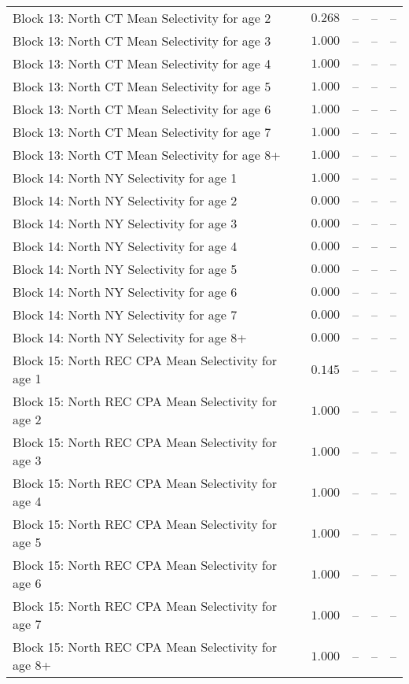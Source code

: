 \documentclass[
]{article}
\begin{document}
\begin{landscape}
\begin{longtable}[t]{lrrrr}
Block 13: North CT Mean Selectivity for age 2 & $0.268$ & -- & -- & --\\
\addlinespace
Block 13: North CT Mean Selectivity for age 3 & $1.000$ & -- & -- & --\\
Block 13: North CT Mean Selectivity for age 4 & $1.000$ & -- & -- & --\\
Block 13: North CT Mean Selectivity for age 5 & $1.000$ & -- & -- & --\\
Block 13: North CT Mean Selectivity for age 6 & $1.000$ & -- & -- & --\\
Block 13: North CT Mean Selectivity for age 7 & $1.000$ & -- & -- & --\\
\addlinespace
Block 13: North CT Mean Selectivity for age 8+ & $1.000$ & -- & -- & --\\
Block 14: North NY Selectivity for age 1 & $1.000$ & -- & -- & --\\
Block 14: North NY Selectivity for age 2 & $0.000$ & -- & -- & --\\
Block 14: North NY Selectivity for age 3 & $0.000$ & -- & -- & --\\
Block 14: North NY Selectivity for age 4 & $0.000$ & -- & -- & --\\
\addlinespace
Block 14: North NY Selectivity for age 5 & $0.000$ & -- & -- & --\\
Block 14: North NY Selectivity for age 6 & $0.000$ & -- & -- & --\\
Block 14: North NY Selectivity for age 7 & $0.000$ & -- & -- & --\\
Block 14: North NY Selectivity for age 8+ & $0.000$ & -- & -- & --\\
Block 15: North REC CPA Mean Selectivity for age 1 & $0.145$ & -- & -- & --\\
\addlinespace
Block 15: North REC CPA Mean Selectivity for age 2 & $1.000$ & -- & -- & --\\
Block 15: North REC CPA Mean Selectivity for age 3 & $1.000$ & -- & -- & --\\
Block 15: North REC CPA Mean Selectivity for age 4 & $1.000$ & -- & -- & --\\
Block 15: North REC CPA Mean Selectivity for age 5 & $1.000$ & -- & -- & --\\
Block 15: North REC CPA Mean Selectivity for age 6 & $1.000$ & -- & -- & --\\
\addlinespace
Block 15: North REC CPA Mean Selectivity for age 7 & $1.000$ & -- & -- & --\\
Block 15: North REC CPA Mean Selectivity for age 8+ & $1.000$ & -- & -- & --\\

\end{longtable}
\end{landscape}
\end{document}
